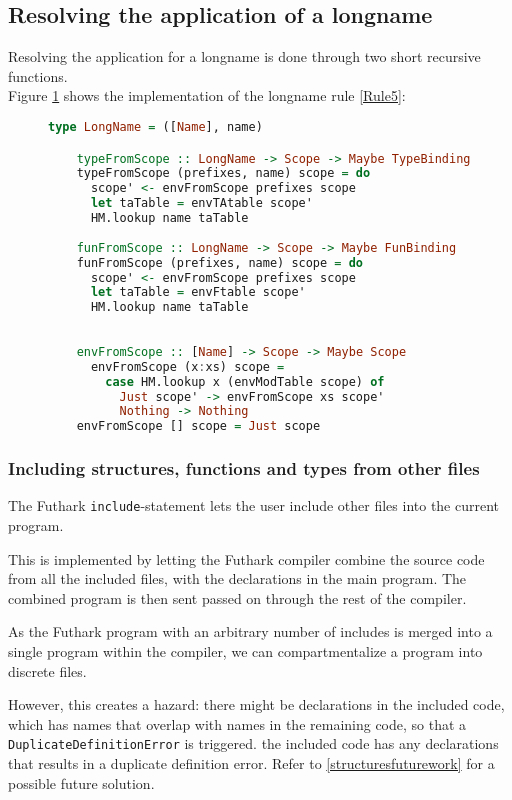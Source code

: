 \subsection{Resolving the application of a longname}
Resolving the application for a longname is done through two short recursive
functions.
\\
Figure \ref{resolvelongname} shows the implementation of the longname rule
\ref{Rule5}:
\begin{figure}\label{resolvelongname}
  \begin{lstlisting}[language=Haskell]
    type LongName = ([Name], name)

    typeFromScope :: LongName -> Scope -> Maybe TypeBinding
    typeFromScope (prefixes, name) scope = do
      scope' <- envFromScope prefixes scope
      let taTable = envTAtable scope'
      HM.lookup name taTable
    
    funFromScope :: LongName -> Scope -> Maybe FunBinding
    funFromScope (prefixes, name) scope = do
      scope' <- envFromScope prefixes scope
      let taTable = envFtable scope'
      HM.lookup name taTable
    
    
    envFromScope :: [Name] -> Scope -> Maybe Scope
      envFromScope (x:xs) scope =
        case HM.lookup x (envModTable scope) of
          Just scope' -> envFromScope xs scope'
          Nothing -> Nothing
    envFromScope [] scope = Just scope
\end{lstlisting}
\end{figure}

\subsubsection{Including structures, functions and types from other files}\label{structuresincludes}
The Futhark \texttt{include}-statement lets the user include
other files into the current program.

This is implemented by letting the Futhark compiler combine the source code from
all the included files, with the declarations in the main program. The combined
program is then sent passed on through the rest of the compiler.

As the Futhark program with an arbitrary number of includes is merged into a
single program within the compiler, we can compartmentalize a program into
discrete files.

However, this creates a hazard: there might be declarations in the included
code, which has names that overlap with names in the remaining code, so that a
\texttt{DuplicateDefinitionError} is triggered. the included code has any declarations
that results in a duplicate definition error. Refer to
\ref{structuresfuturework} for a possible future solution.

